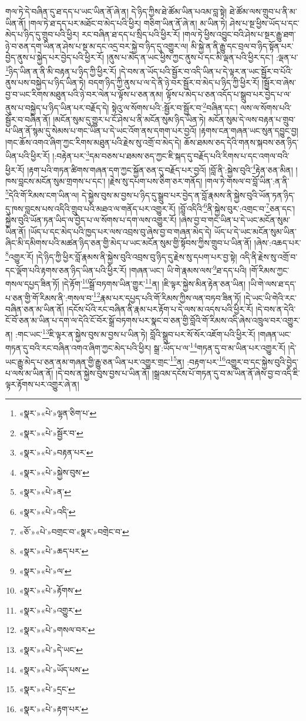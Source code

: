གལ་ཏེ་དེ་བཞིན་དུ་ཐ་དད་པ་ཡང་ཡིན་ནོ་ཞེ་ན། དེ་ཉིད་ཀྱིས་ཐེ་ཚོམ་ཡིན་པའམ་བླ་སྟེ། ཐེ་ཚོམ་ལས་གྲུབ་པ་ནི་མ་ཡིན་ནོ། །གལ་ཏེ་ཐ་དད་པར་མཐོང་བ་མེད་པའི་ཕྱིར། གཅིག་ཡིན་ནོ་ཞེ་ན། མ་ཡིན་ཏེ། ཤེས་པ་སྔ་ཕྱིས་ཡོད་པ་དང་མེད་པ་ཉིད་དུ་གྲུབ་པའི་ཕྱིར། རང་བཞིན་ཐ་དད་པ་སྲིད་པའི་ཕྱིར་རོ། །གལ་ཏེ་ཕྱིས་འབྱུང་བའི་ཤེས་པ་སྔར་རྒྱུ་ཐག་ཉེ་བ་ཅན་དག་ཡིན་ན་ཤེས་པ་སྔ་མ་དང་འདྲ་བར་སྐྱེ་བ་ཉིད་དུ་འགྱུར་ལ། མི་སྐྱེ་ན་ནི་རྒྱུ་དང་བྲལ་བ་ཉིད་སྟོན་པར་བྱེད་ནུས་པ་སྐྱེད་པར་བྱེད་པའི་ཕྱིར་རོ། །ནུས་པ་མེད་ན་ཡང་ཕྱིས་ཀྱང་ནུས་པ་དང་མི་ལྡན་པའི་ཕྱིར་དང་། :ལྡན་པ་\footnote{«སྣར་»«པེ་»ལྷན་ཅིག་པ་}ཉིད་ཡིན་ན་ནི་མི་བརྟན་པ་ཉིད་ཀྱི་ཕྱིར་རོ། །དེ་བས་ན་ཡོད་པའི་སྦྱོར་བ་འདི་ཡིན་པ་དེ་ལྟར་ན་ཡང་སྦྱོར་བ་པོའི་ནུས་པས་བསྐྱེད་པ་ཉིད་ཡིན་ཏེ། བདག་ཉིད་ཀྱི་ནུས་པ་ལ་དེ་ནི་ཉེ་བར་སྦྱོར་བ་མེད་པ་ཉིད་ཀྱི་ཕྱིར་རོ། །སྦྱོར་བ་ཞེས་བྱ་བ་ཡང་རིགས་མཐུན་པའི་ཉེ་བར་ལེན་པ་ལྟོས་པ་ཅན་ནམ། ལྟོས་པ་མེད་པ་ཅན་འདོད་པ་སྒྲུབ་པར་བྱེད་པ་ལ་ནུས་པ་བསྐྱེད་པ་ཉིད་ཡིན་པར་བརྗོད་དེ། སྟེའུ་ལ་སོགས་པའི་:སྦྱོར་བ་སྦྱོར་བ་\footnote{«སྣར་»«པེ་»སྦྱོར་བ་}བཞིན་དང་། ལས་ལ་སོགས་པའི་སྦྱོར་བ་བཞིན་ནོ། །མངོན་སུམ་དུ་གྱུར་པ་ངོ་ཤེས་པ་ནི་མངོན་སུམ་ཉིད་ཡིན་ཏེ། མངོན་སུམ་དེ་ལས་བརྟན་པ་གྲུབ་པ་ཡིན་ནོ་སྙམ་དུ་སེམས་པ་གང་ཡིན་པ་དེ་ཡང་འོག་ནས་དགག་པར་བྱའོ། །རྟགས་ངན་གཞན་ཡང་སུན་དབྱུང་བྱ། །གང་ཆོས་འགའ་ཞིག་ཀྱང་རིགས་མཐུན་པའི་རྗེས་སུ་འགྲོ་བ་མེད་དེ། ཆོས་ཐམས་ཅད་དེའི་གནས་སྐབས་ཅན་ཉིད་ཡིན་པའི་ཕྱིར་རོ། །:བརྟེན་པར་\footnote{«སྣར་»«པེ་»བརྟན་པར་}དམ་བཅས་པ་ཐམས་ཅད་ཀྱང་ཇི་སྐད་དུ་བརྗོད་པའི་རིགས་པ་དང་འགལ་བའི་ཕྱིར་རོ། །རྟག་པའི་གཏན་ཚིགས་གཞན་དག་ཀྱང་སྐྱོན་ཅན་དུ་བརྗོད་པར་བྱའོ། །བློ་ནི་:སྐྱེས་བུའི་\footnote{«སྣར་»«པེ་»སྐྱེས་བུས་}རྟེན་ཅན་མིན། །ཁས་བླངས་མངོན་སུམ་གྲགས་པ་དང་། །རྗེས་སུ་དཔག་པས་ཅིག་ཅར་གནོད། །གལ་ཏེ་གསལ་བ་བློ་ཡིན་:ན་ནི་\footnote{«སྣར་»«པེ་»ན་}དེའི་གོ་རིམས་ངག་ཡིན་ལ། དེ་སྐྱེས་བུས་མ་བྱས་པ་ཉིད་དུ་སྒྲུབ་པར་བྱེད་ན་བློ་རྣམས་ནི་སྐྱེས་བུའི་ཡོན་ཏན་ཉིད་དུ་ཁས་བླངས་པས་འདིའི་གྲུབ་པའི་མཐའ་ལ་གནོད་པར་འགྱུར་རོ། །བློ་འདིའི་\footnote{«སྣར་»«པེ་»འདི་}ནི་སྐྱེས་བུར་:འགྲང་བ་\footnote{«ཅོ་»«པེ་»བགྲང་བ་«སྣར་»བགྲེང་བ་}ཅན་དང་། སྐྱེས་བུའི་ཡོན་ཏན་ཡིད་ལ་བྱེད་པ་ལ་སོགས་པ་དག་ལས་འགྱུར་རོ། །ཞེས་བྱ་བ་གང་ཡིན་པ་དེ་ཡང་མངོན་སུམ་ཡིན་ནོ། །ཡོད་པ་དང་མེད་པའི་ཁྱད་པར་ལས་འབྲས་བུ་ཞེས་བྱ་བ་གཞན་མེད་དེ། ཡོད་པ་དེ་ཡང་མངོན་སུམ་ཡིན་ཞིང་མི་དམིགས་པའི་མཚན་ཉིད་ཅན་གྱི་མེད་པ་ཡང་མངོན་སུམ་གྱི་སྟོབས་ཀྱིས་གྲུབ་པ་ཡིན་ནོ། །ཞེས་:འཆད་པར་\footnote{«སྣར་»«པེ་»ཆད་པར་}འགྱུར་རོ། །དེ་ཉིད་ཀྱི་ཕྱིར་བློ་རྣམས་ནི་སྐྱེས་བུའི་འབྲས་བུ་ཉིད་དུ་རྗེས་སུ་དཔག་པར་བྱ་སྟེ། འདི་ནི་རྗེས་སུ་འགྲོ་བ་དང་ལྡོག་པའི་རྟགས་ཅན་ཉིད་ཡིན་པའི་ཕྱིར་རོ། །གཞན་ཡང་། ཡི་གེ་རྣམས་ལས་\footnote{«སྣར་»«པེ་»ལ་}ཐ་དད་པའི། །གོ་རིམས་ཀྱང་གསལ་དཔྱད་ཟིན་ཏོ། །དེ་རྟོག་\footnote{«སྣར་»«པེ་»རྟོགས་}སྒྲོ་བཏགས་ཡིན་གྱུར་\footnote{«སྣར་»«པེ་»འགྱུར་}ན། །ཇི་ལྟར་སྐྱེས་མིན་རྟེན་ཅན་ཡིན། །ཡི་གེ་ལས་ཐ་དད་པ་ཅན་གྱི་གོ་རིམས་ནི་:གསལ་བ་\footnote{«སྣར་»«པེ་»གསལ་བར་}རྣམ་པར་དཔྱད་པའི་གོ་རིམས་ཀྱིས་ལན་བཏབ་ཟིན་ཏོ། །དེ་ཡང་ཡི་གེའི་རང་བཞིན་ཅན་མ་ཡིན་ནོ། །དངོས་པོའི་རང་བཞིན་ནི་རྣམ་པར་རྟོག་པ་དེ་ལས་མ་འདས་པའི་ཕྱིར་རོ། །དེ་བས་ན་དེའི་ངོ་བོ་ཅན་མ་ཡིན་པ་དག་ལ་དེའི་ངོ་བོར་སྒྲོ་བཏགས་པར་སྣང་བ་ཅན་གྱི་བློའི་གོ་རིམས་འདི་ཞེས་འཁྲུལ་བར་འགྱུར་ན། :གང་ཡང་\footnote{«སྣར་»«པེ་»དེ་ཡང་}ཇི་ལྟར་ན་སྐྱེས་བུས་མ་བྱས་པ་ཡིན་ཏེ། བློའི་སྒྲུབ་པར་སོ་སོར་འཇོག་པའི་ཕྱིར་རོ། །གཞན་ཡང་གཏན་དུ་བའི་རང་བཞིན་འགའ་ཞིག་ཀྱང་མེད་པའི་ཕྱིར། སྒྲ་:ཡོད་པ་ལ་\footnote{«སྣར་»«པེ་»ཡོད་པས་}གཏན་དུ་བ་མ་ཡིན་པར་འགྱུར་རོ། །དེ་ཡང་རྒྱུ་མེད་པ་ཅན་ནམ་གཞན་གྱི་རྒྱུ་ཅན་ཡིན་པར་འགྱུར་གྲང་\footnote{«སྣར་»«པེ་»དྲང་}ན། :བརྟག་པར་\footnote{«སྣར་»«པེ་»རྟག་པར་}འགྱུར་བ་དང་སྐྱེས་བུའི་བྱེད་པ་ལས་མ་ཡིན་ནོ། །དེ་བས་ན་སྐྱེས་བུས་བྱས་པ་ཡིན་ནོ། །སྒྲའམ་དངོས་པོ་གཏན་དུ་བ་མ་ཡིན་ནོ་ཞེས་བྱ་བ་འདི་ཇི་ལྟར་རྟོགས་པར་འགྱུར་ཞེ་ན། 